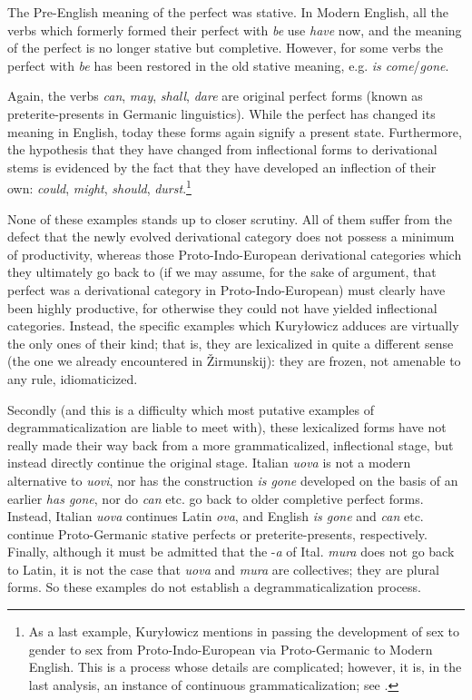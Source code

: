 The Pre-English meaning of the perfect was stative. In Modern English, all the verbs which formerly formed their perfect with \textit{be} use \textit{have} now, and the meaning of the perfect is no longer stative but completive. However, for some verbs the perfect with \textit{be} has been restored in the old stative meaning, e.g. \textit{is come}/\textit{gone}.

Again, the verbs \textit{can}, \textit{may}, \textit{shall}, \textit{dare} are original perfect forms (known as preterite-presents in Germanic linguistics). While the perfect has changed its meaning in English, today these forms again signify a present state. Furthermore, the hypothesis that they have changed from inflectional forms to derivational stems is evidenced by the fact that they have developed an inflection of their own: \textit{could}, \textit{might}, \textit{should}, \textit{durst}.\footnote{As a last example, Kuryłowicz mentions in passing the development of sex to gender to sex from Proto-Indo-European via Proto-Germanic to Modern English. This is a process whose details are complicated; however, it is, in the last analysis, an instance of continuous grammaticalization; see \citet[§~7.2]{Lehmann1982b}.}

None of these examples stands up to closer scrutiny. All of them suffer from the defect that the newly evolved derivational category does not possess a minimum of productivity, whereas those Proto-Indo-European derivational categories which they ultimately go back to (if we may assume, for the sake of argument, that perfect was a derivational category in Proto-Indo-European) must clearly have been highly productive, for otherwise they could not have yielded inflectional categories. Instead, the specific examples which Kuryłowicz adduces are virtually the only ones of their kind; that is, they are lexicalized in quite a different sense (the one we already encountered in Žirmunskij): they are frozen, not amenable to any rule, idiomaticized.

Secondly (and this is a difficulty which most putative examples of degrammaticalization are liable to meet with), these lexicalized forms have not really made their way back from a more grammaticalized, inflectional stage, but instead directly continue the original stage. Italian \textit{uova} is not a modern alternative to \textit{uovi}, nor has the construction \textit{is gone} developed on the basis of an earlier \textit{has gone}, nor do \textit{can} etc. go back to older completive perfect forms. Instead, Italian \textit{uova} continues Latin \textit{ova}, and English \textit{is gone} and \textit{can} etc. continue Proto-Germanic stative perfects or preterite-presents, respectively. Finally, although it must be admitted that the -\textit{a} of Ital. \textit{mura} does not go back to Latin, it is not the case that \textit{uova} and \textit{mura} are collectives; they are plural forms. So these examples do not establish a degrammaticalization process.

